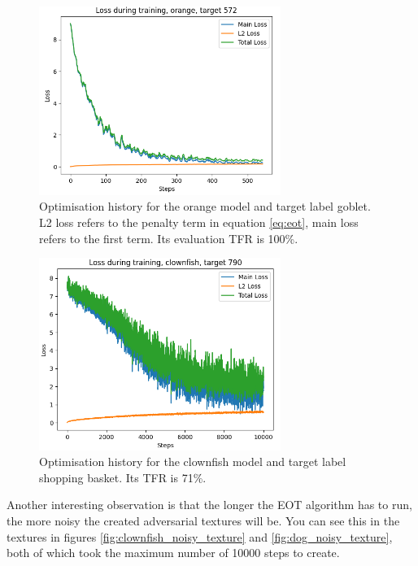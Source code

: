 \begin{figure}[ht]
    \centering
    \includegraphics[width=0.7\textwidth]{graphics/eot_orange_loss_history.PNG}
    \caption[Optimisation history for the orange model and target label goblet.]{Optimisation history for the orange model and target label goblet. L2 loss refers to the penalty term in equation \ref{eq:eot}, main loss refers to the first term. Its evaluation TFR is 100\%.}
    \label{fig:eot_orange_loss_history}
\end{figure}

\begin{figure}[ht]
    \centering
    \includegraphics[width=0.7\textwidth]{graphics/eot_clownfish_loss_history.PNG}
    \caption[Optimisation history for the clownfish model and target label shopping basket.]{Optimisation history for the clownfish model and target label shopping basket. Its TFR is 71\%.}
    \label{fig:eot_clownfish_loss_history}
\end{figure}

Another interesting observation is that the longer the EOT algorithm has to run, the more noisy the created adversarial textures will be. You can see this in the textures in figures  \ref{fig:clownfish_noisy_texture} and \ref{fig:dog_noisy_texture}, both of which took the maximum number of 10000 steps to create.

